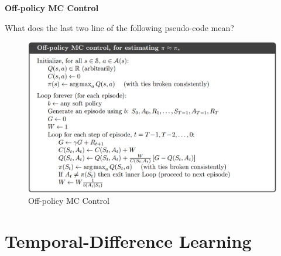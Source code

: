 \documentclass{article}
\begin{document}
\noindent
\textbf{Off-policy MC Control}

\noindent
What does the last two line of the following pseudo-code mean?

\begin{figure}[h]
\includegraphics[scale=0.25]{offpolicy_mc_control}
\centering
\caption{Off-policy MC Control}
\end{figure}

\newpage
\noindent
\section{Temporal-Difference Learning}
\end{document}
